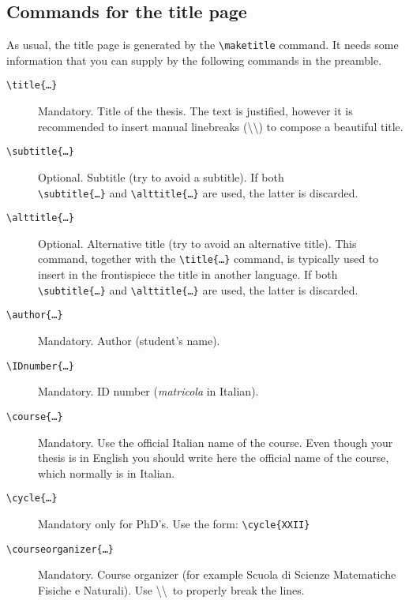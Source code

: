 \documentclass[a5paper,12pt]{article}
\newcommand{\bs}{\textbackslash}
\begin{document}
\subsection[Commands for the\\ title page]{Commands for the title page}
\label{commands_titlepage}

As usual, the title page is generated by the \texttt{\bs maketitle} command.
It needs some information that you can supply by the following commands
in the preamble.
\begin{description}
\item[\texttt{\bs title\{\dots\}}] Mandatory. Title of the thesis. The text is justified, however it is recommended to insert manual linebreaks (\bs\bs) to compose a beautiful title.

\item[\texttt{\bs subtitle\{\dots\}}] Optional. Subtitle (try to avoid a subtitle). If both\\ \texttt{\bs subtitle\{\dots\}} and \texttt{\bs alttitle\{\dots\}} are used, the latter is discarded. 

\item[\texttt{\bs alttitle\{\dots\}}] Optional. Alternative title (try to avoid an alternative title). This command, together with the \texttt{\bs title\{\dots\}} command, is typically used to insert in the frontispiece the title in another language. If both \texttt{\bs subtitle\{\dots\}} and \texttt{\bs alttitle\{\dots\}} are used, the latter is discarded.

\item[\texttt{\bs author\{\dots\}}] Mandatory. Author (student's name).

\item[\texttt{\bs IDnumber\{\dots\}}] Mandatory. ID number (\textit{matricola} in Italian).

\item[\texttt{\bs course\{\dots\}}] Mandatory. Use the official Italian name of the course.
Even though your thesis is in English you should write here the official name of the course, which normally is in Italian.

\item[\texttt{\bs cycle\{\dots\}}] Mandatory only for PhD's. Use the form: \texttt{\bs cycle\{XXII\}}

\item[\texttt{\bs courseorganizer\{\dots\}}] Mandatory. Course organizer (for example Scuola di Scienze Matematiche Fisiche e Naturali). Use \bs\bs\ to properly break the lines.


\end{description}
\end{document}
